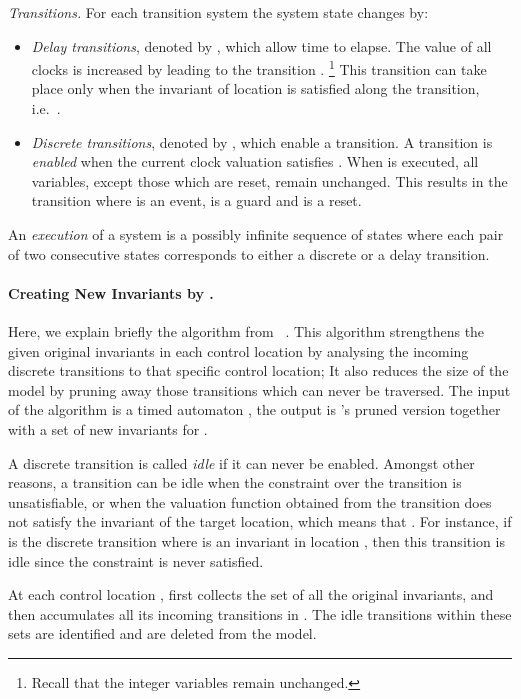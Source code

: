 \documentclass{eptcs}
\begin{document}
\noindent
{\em Transitions.} 
For each transition system the system state changes by:\begin{itemize}

\item {\em Delay transitions}, denoted by , which allow time  to 
elapse. The value of all clocks is increased by  leading to the
transition .
\footnote{Recall that the integer variables remain unchanged.} 
This transition can take place only when the invariant of location  is
satisfied along the transition, i.e.\ .

\item {\em Discrete transitions}, denoted by , which enable a transition. A transition
   is {\em enabled} when the current clock valuation satisfies
  .  When  is executed, all variables, except those which are
  reset, remain unchanged. This results in the transition  where  is an event,  is a guard
  and  is a reset.
\end{itemize}
An {\em execution} of a system is a possibly infinite sequence of
states 
 where each pair of two consecutive states corresponds to
either a discrete or a delay transition.









\paragraph{Creating New Invariants by .}
Here, we explain briefly the  algorithm from ~\cite{BaLeSm09}. This
algorithm strengthens the given original invariants in each control location
by analysing the incoming discrete transitions to that specific control
location; It also reduces the size of the model by pruning away those
transitions which can never be traversed.
The input of the  algorithm is a timed automaton , the output is
's pruned version together with a set of new invariants for .

A discrete transition  is called {\em idle}
if it can never be enabled.  Amongst other reasons, a transition can be idle
when the constraint over the transition is unsatisfiable, or when the
valuation function obtained from the transition does not satisfy the invariant
of the target location, which means that .  For
instance, if  is the discrete transition  where  is an invariant in location , then
this transition is idle since the constraint  is never satisfied.

At each control location ,  first collects the set  of
all the original invariants, and then accumulates all its incoming transitions
in .  The idle transitions within these sets are identified and
are deleted from the model.
\end{document}

